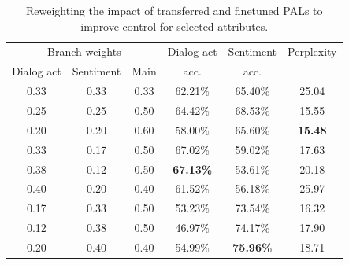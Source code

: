 \documentclass[11pt]{article}
\begin{document}
\begin{table}[ht]
\fontsize{9}{11}
\selectfont 
\centering
\begin{tabular}{cccccc}
\hline
\multicolumn{3}{c}{Branch weights} & Dialog act & Sentiment & Perplexity \\
Dialog act   & Sentiment & Main  & acc.       & acc.      &            \\ \hline
0.33          & 0.33       & 0.33   & 62.21\%    & 65.40\%   & 25.04      \\
0.25          & 0.25       & 0.50   & 64.42\%    & 68.53\%   & 15.55      \\
0.20          & 0.20       & 0.60   & 58.00\%    & 65.60\%   & \textbf{15.48}      \\ \hline
0.33          & 0.17       & 0.50   & 67.02\%    & 59.02\%   & 17.63      \\
0.38          & 0.12       & 0.50   & \textbf{67.13\%}    & 53.61\%   & 20.18      \\
0.40          & 0.20       & 0.40   & 61.52\%    & 56.18\%   & 25.97      \\ \hline
0.17          & 0.33       & 0.50   & 53.23\%    & 73.54\%   & 16.32      \\
0.12          & 0.38       & 0.50   & 46.97\%    & 74.17\%   & 17.90      \\ 
0.20          & 0.40       & 0.40   & 54.99\%    & \textbf{75.96\%}   & 18.71      \\ \hline
\end{tabular}
\caption{Reweighting the impact of transferred and finetuned PALs to improve control for selected attributes.}
\label{reweighting_transfered_finetuned}
\end{table}
\end{document}
